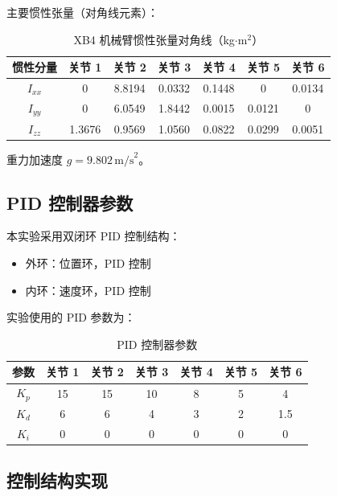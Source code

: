 \documentclass[12pt,a4paper,oneside]{article}
\numberwithin{equation}{section}
\begin{document}
主要惯性张量（对角线元素）：

\begin{table}[H]
    \centering
    \caption{XB4 机械臂惯性张量对角线（kg$\cdot$m$^2$）}
    \begin{tabular}{ccccccc}
        \toprule
        \textbf{惯性分量} & 关节 1 & 关节 2 & 关节 3 & 关节 4 & 关节 5 & 关节 6 \\
        \midrule
        $I_{xx}$ & 0      & 8.8194 & 0.0332 & 0.1448 & 0      & 0.0134 \\
        $I_{yy}$ & 0      & 6.0549 & 1.8442 & 0.0015 & 0.0121 & 0      \\
        $I_{zz}$ & 1.3676 & 0.9569 & 1.0560 & 0.0822 & 0.0299 & 0.0051 \\
        \bottomrule
    \end{tabular}
\end{table}

重力加速度 $g = 9.802 \, \text{m/s}^2$。

\subsection{PID 控制器参数}

本实验采用双闭环 PID 控制结构：
\begin{itemize}
    \item 外环：位置环，PID 控制
    \item 内环：速度环，PID 控制
\end{itemize}

实验使用的 PID 参数为：

\begin{table}[H]
    \centering
    \caption{PID 控制器参数}
    \begin{tabular}{ccccccc}
        \toprule
        \textbf{参数} & 关节 1 & 关节 2 & 关节 3 & 关节 4 & 关节 5 & 关节 6 \\
        \midrule
        $K_p$ & 15 & 15 & 10 & 8 & 5 & 4 \\
        $K_d$ & 6  & 6  & 4  & 3 & 2 & 1.5 \\
        $K_i$ & 0  & 0  & 0  & 0 & 0 & 0 \\
        \bottomrule
    \end{tabular}
\end{table}

\subsection{控制结构实现}
\end{document}
